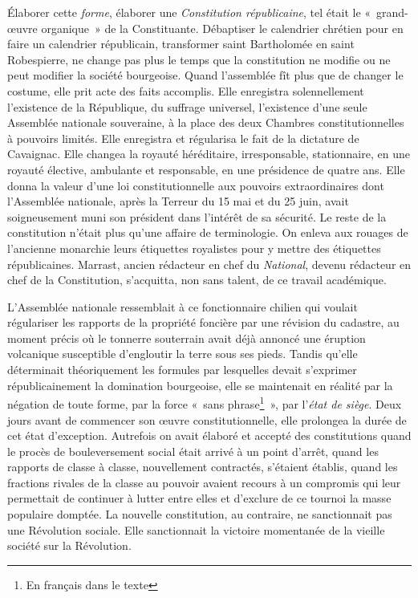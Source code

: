 \documentclass[french,twoside]{book} %
\begin{document}
Élaborer cette \emph{forme}, élaborer une \emph{Constitution républicaine}, tel était le « grand-œuvre organique » de la Constituante. Débaptiser le calendrier chrétien pour en faire un calendrier républicain, transformer saint Bartholomée en saint Robespierre, ne change pas plus le temps que la constitution ne modifie ou ne peut modifier la société bourgeoise. Quand l’assemblée fît plus que de changer le costume, elle prit acte des faits accomplis. Elle enregistra solennellement l’existence de la République, du suffrage universel, l’existence d’une seule Assemblée nationale souveraine, à la place des deux Chambres constitutionnelles à pouvoirs limités. Elle enregistra et régularisa le fait de la dictature de Cavaignac. Elle changea la royauté héréditaire, irresponsable, stationnaire, en une royauté élective, ambulante et responsable, en une présidence de quatre ans. Elle donna la valeur d’une loi constitutionnelle aux pouvoirs extraordinaires dont l’Assemblée nationale, après la Terreur du 15 mai et du 25 juin, avait soigneusement muni son président dans l’intérêt de sa sécurité. Le reste de la constitution n’était plus qu’une affaire de terminologie. On enleva aux rouages de l’ancienne monarchie leurs étiquettes royalistes pour y mettre des étiquettes républicaines. Marrast, ancien rédacteur en chef du \emph{National}, devenu rédacteur en chef de la Constitution, s’acquitta, non sans talent, de ce travail académique.\par
L’Assemblée nationale ressemblait à ce fonctionnaire chilien qui voulait régulariser les rapports de la propriété foncière par une révision du cadastre, au moment précis où le tonnerre souterrain avait déjà annoncé une éruption volcanique susceptible d’engloutir la terre sous ses pieds. Tandis qu’elle déterminait théoriquement les formules par lesquelles devait s’exprimer républicainement la domination bourgeoise, elle se maintenait en réalité par la négation de toute forme, par la force « sans phrase\footnote{En français dans le texte} », par l’\emph{état de siège}. Deux jours avant de commencer son œuvre constitutionnelle, elle prolongea la durée de cet état d’exception. Autrefois on avait élaboré et accepté des constitutions quand le procès de bouleversement social était arrivé à un point d’arrêt, quand les rapports de classe à classe, nouvellement contractés, s’étaient établis, quand les fractions rivales de la classe au pouvoir avaient recours à un compromis qui leur permettait de continuer à lutter entre elles et d’exclure de ce tournoi la masse populaire domptée. La nouvelle constitution, au contraire, ne sanctionnait pas une Révolution sociale. Elle sanctionnait la victoire momentanée de la vieille société sur la Révolution.\par
\end{document}
